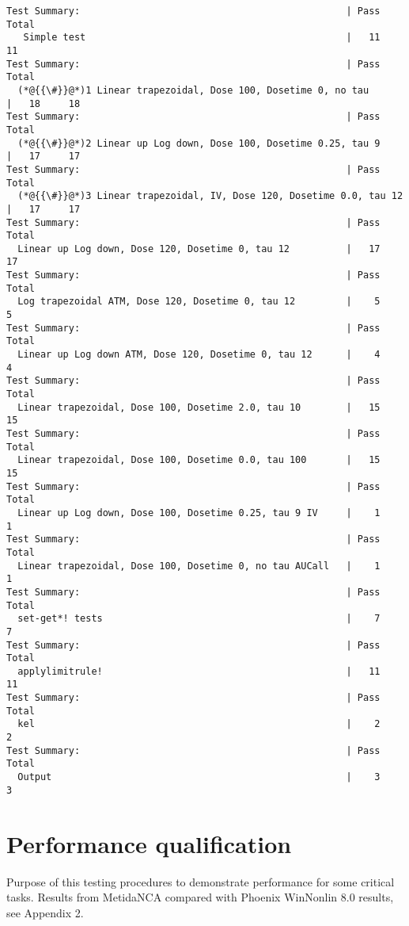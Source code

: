 \documentclass[12pt,a4paper]{article}
\begin{document}
\begin{lstlisting}
Test Summary:                                               | Pass  Total
   Simple test                                              |   11     11
Test Summary:                                               | Pass  Total
  (*@{{\#}}@*)1 Linear trapezoidal, Dose 100, Dosetime 0, no tau       |   18     18
Test Summary:                                               | Pass  Total
  (*@{{\#}}@*)2 Linear up Log down, Dose 100, Dosetime 0.25, tau 9     |   17     17
Test Summary:                                               | Pass  Total
  (*@{{\#}}@*)3 Linear trapezoidal, IV, Dose 120, Dosetime 0.0, tau 12 |   17     17
Test Summary:                                               | Pass  Total
  Linear up Log down, Dose 120, Dosetime 0, tau 12          |   17     17
Test Summary:                                               | Pass  Total
  Log trapezoidal ATM, Dose 120, Dosetime 0, tau 12         |    5      5
Test Summary:                                               | Pass  Total
  Linear up Log down ATM, Dose 120, Dosetime 0, tau 12      |    4      4
Test Summary:                                               | Pass  Total
  Linear trapezoidal, Dose 100, Dosetime 2.0, tau 10        |   15     15
Test Summary:                                               | Pass  Total
  Linear trapezoidal, Dose 100, Dosetime 0.0, tau 100       |   15     15
Test Summary:                                               | Pass  Total
  Linear up Log down, Dose 100, Dosetime 0.25, tau 9 IV     |    1      1
Test Summary:                                               | Pass  Total
  Linear trapezoidal, Dose 100, Dosetime 0, no tau AUCall   |    1      1
Test Summary:                                               | Pass  Total
  set-get*! tests                                           |    7      7
Test Summary:                                               | Pass  Total
  applylimitrule!                                           |   11     11
Test Summary:                                               | Pass  Total
  kel                                                       |    2      2
Test Summary:                                               | Pass  Total
  Output                                                    |    3      3
\end{lstlisting}


\section{Performance qualification}
Purpose of this testing procedures to demonstrate performance for some critical tasks. Results from MetidaNCA compared with Phoenix WinNonlin 8.0 results, see Appendix 2.
\end{document}
